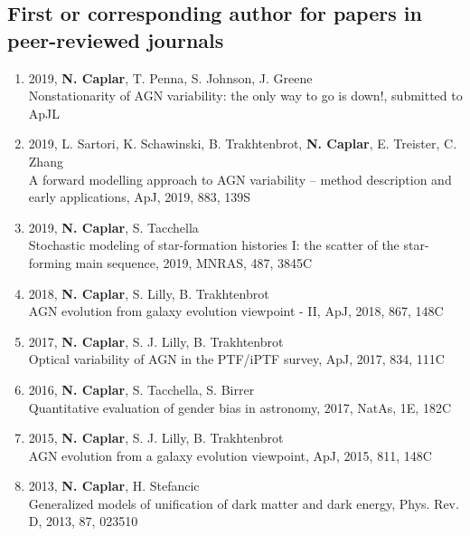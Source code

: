 \documentclass[11pt,letterpaper]{article}
\begin{document}

\subsection*{First or corresponding author for papers in  peer-reviewed journals}

\begin{enumerate}

\item 2019, \textbf{N. Caplar}, T. Penna, S. Johnson, J. Greene \\
Nonstationarity of AGN variability: the only way to go is down!, submitted to ApJL

\item 2019, L. Sartori, K. Schawinski, B. Trakhtenbrot, \textbf{N. Caplar}, E. Treister, C. Zhang\\
A forward modelling approach to AGN variability – method
description and early applications, ApJ, 2019, 883, 139S

\item 2019, \textbf{N. Caplar}, S. Tacchella \\
Stochastic modeling of star-formation histories I: the scatter of the star-forming main sequence, 2019, MNRAS, 487, 3845C

\item 2018, \textbf{N. Caplar}, S. Lilly, B. Trakhtenbrot\\
AGN evolution from galaxy evolution viewpoint - II, ApJ, 2018, 867, 148C

\item 2017,  \textbf{N. Caplar}, S. J. Lilly, B. Trakhtenbrot   \\Optical variability of AGN in the PTF/iPTF survey, ApJ, 2017, 834, 111C   

\item 2016, \textbf{N. Caplar}, S. Tacchella, S. Birrer \\ Quantitative evaluation of gender bias in astronomy,  2017, NatAs, 1E, 182C
 
\item 2015,  \textbf{N. Caplar}, S. J. Lilly, B. Trakhtenbrot  \\AGN evolution from a galaxy evolution viewpoint, ApJ,  2015, 811, 148C 
  
 \item 2013,  \textbf{N. Caplar}, H. Stefancic  \\ Generalized models of unification of dark matter and dark energy, Phys. Rev. D, 2013, 87, 023510 
\end{enumerate}
\end{document}
